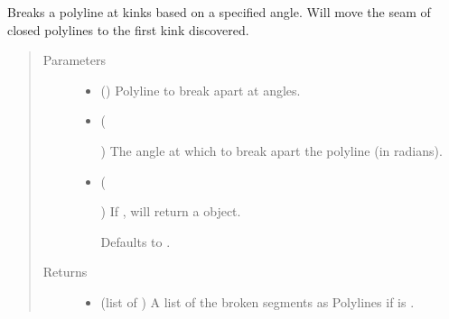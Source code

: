 \documentclass[letterpaper,10pt,english]{sphinxmanual}
\begin{document}
\begin{fulllineitems}
\label{\detokenize{cockatoo:cockatoo.utilities.break_polyline}}
Breaks a polyline at kinks based on a specified angle. Will move the seam
of closed polylines to the first kink discovered.
\begin{quote}\begin{description}
\item[{Parameters}] \leavevmode\begin{itemize}
\item {} 
 () \textendash{} Polyline to break apart at angles.

\item {} 
 (%
\begin{footnote}[53]\sphinxAtStartFootnote
{}
%
\end{footnote}) \textendash{} The angle at which to break apart the polyline (in radians).

\item {} 
 (%
\begin{footnote}[54]\sphinxAtStartFootnote
{}
%
\end{footnote}\sphinxstyleliteralemphasis{\sphinxupquote{, }}) \textendash{} 
If , will return a  object.

Defaults to .


\end{itemize}

\item[{Returns}] \leavevmode
\begin{itemize}
\item {} 
 (list of ) \textendash{} A list of the broken segments as Polylines if  is
.


\end{itemize}
\end{description}
\end{quote}
\end{fulllineitems}
\end{document}
